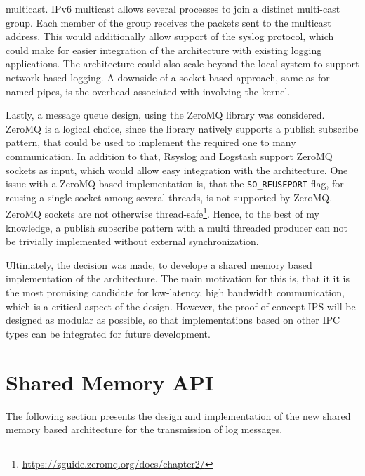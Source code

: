 multicast. \ac{IPv6} multicast allows several processes to join a distinct multi-cast group. Each member of the group receives the packets sent to the multicast address. This would additionally
allow support of the syslog protocol, which could make for easier integration of the architecture with existing logging applications. The architecture could also scale beyond the local system to support 
network-based logging. A downside of a socket based approach, same as for named pipes, is the overhead associated with involving the kernel.
\par 
Lastly, a message queue design, using the ZeroMQ library was considered. ZeroMQ is a logical choice, since the library natively supports a publish subscribe pattern, that could be used to
implement the required one to many communication. In addition to that, Rsyslog and Logstash support ZeroMQ sockets as input, which would allow easy integration with the architecture.
One issue with a ZeroMQ based implementation is, that the \texttt{SO\_REUSEPORT} flag, for reusing a single socket among several threads, is not supported by ZeroMQ\cite{zeromq_issue}. 
ZeroMQ sockets are not otherwise thread-safe\footnote{\url{https://zguide.zeromq.org/docs/chapter2/}}\cite{zeromq}. Hence, to the best of my knowledge, a publish subscribe pattern with a 
multi threaded producer can not be trivially implemented without external synchronization. 
\par 
Ultimately, the decision was made, to develope a shared memory based implementation of the architecture. The main motivation for this is, that it it is the most promising
candidate for low-latency, high bandwidth communication, which is a critical aspect of the design. However, the proof of concept \ac{IPS} will be designed as modular as possible, so
that implementations based on other \ac{IPC} types can be integrated for future development. 

\section{Shared Memory API}

The following section presents the design and implementation of the new shared memory based architecture for the transmission
of log messages. \\

